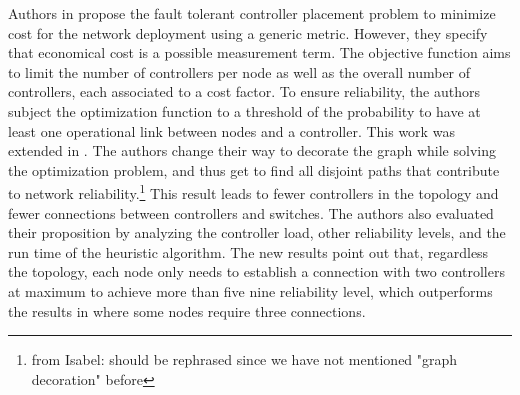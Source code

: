 \documentclass{IEEEtran}
\newcommand\fia[1]{{\color{red}\footnote{\color{red}from Isabel: #1}}} %
\begin{document}
Authors in \cite{RoRu14} propose the fault tolerant controller placement problem to minimize cost for the network deployment using a generic metric. However, they specify that economical cost is a possible measurement term. The objective function aims to limit the number of controllers per node as well as the overall number of controllers, each  associated to a cost factor. To ensure reliability, the authors subject the optimization function to a threshold of the probability to have at least one operational link between nodes and a controller. %
This work was extended in \cite{RoRu16}. The authors change their way to decorate the graph while solving the optimization problem, and thus get to find all disjoint paths that contribute to network reliability.\fia{should be rephrased since we have not mentioned "graph decoration" before} This result leads to fewer controllers in the topology and fewer connections between controllers and switches. The authors also evaluated their proposition by analyzing the controller load, other reliability levels, and the run time of the heuristic algorithm. The new results point out that, regardless the topology, each node only needs to establish a connection with two controllers at maximum to achieve more than five nine reliability level, which outperforms the results in \cite{RoRu14} where some nodes require three connections. 
\end{document}
